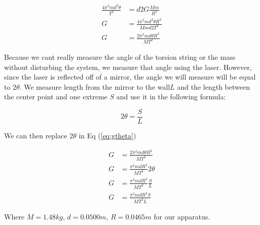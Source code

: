 \documentclass{report}
\begin{document}
\begin{equation}
    \begin{aligned}
        \frac{4\pi^2md^2\theta}{T^2}&=d2G\frac{Mm}{R^2}\\
        G&=\frac{4\pi^2md^2\theta R^2}{Mmd2T^2}\\
        G&=\frac{2\pi^2md\theta R^2}{MT^2}\label{eq:gtheta}
    \end{aligned}
\end{equation}

Because we cant really measure the angle of the torsion string or the mass without disturbing the system, we measure that angle using the laser. However, since the laser is reflected off of a mirror, the angle we will measure will be equal to $2\theta$. We measure length from the mirror to the wall$L$ and the length between the center point and one extreme $S$ and use it in the following formula:

\begin{equation}
    2\theta = \frac{S}{L}
\end{equation}

We can then replace $2\theta$ in Eq (\ref{eq:gtheta})

\begin{equation}
    \begin{aligned}
        G&=\frac{2\pi^2md\theta R^2}{MT^2}\\
        G&=\frac{\pi^2mdR^2}{MT^2} 2\theta\\
        G&=\frac{\pi^2mdR^2}{MT^2}  \frac{S}{L}\\
        G&=\frac{\pi^2mdR^2S}{MT^2L}
    \end{aligned}
\end{equation}

Where $M = 1.48kg$, $d = 0.0500m$, $R = 0.0465m$ for our apparatus.
\end{document}
